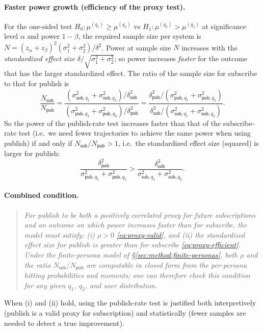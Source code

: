 \paragraph{Faster power growth (efficiency of the proxy test).}
For the one-sided test $H_0: \mu^{(q_1)} \geq \mu^{(q_2)}$ vs $H_1: \mu^{(q_2)} > \mu^{(q_1)}$ at significance level $\alpha$ and power $1-\beta$, the required sample size per system is $N = (z_\alpha + z_\beta)^2 (\sigma_1^2 + \sigma_2^2) / \delta^2$. Power at sample size $N$ increases with the \emph{standardized effect size} $\delta / \sqrt{\sigma_1^2 + \sigma_2^2}$; so power increases \emph{faster} for the outcome that has the larger standardized effect. The ratio of the sample size for subscribe to that for publish is
\begin{equation}
  \frac{N_{\mathsf{sub}}}{N_{\mathsf{pub}}} = \frac{(\sigma_{\mathsf{sub},q_1}^2 + \sigma_{\mathsf{sub},q_2}^2) / \delta_{\mathsf{sub}}^2}{(\sigma_{\mathsf{pub},q_1}^2 + \sigma_{\mathsf{pub},q_2}^2) / \delta_{\mathsf{pub}}^2} = \frac{\delta_{\mathsf{pub}}^2 / (\sigma_{\mathsf{pub},q_1}^2 + \sigma_{\mathsf{pub},q_2}^2)}{\delta_{\mathsf{sub}}^2 / (\sigma_{\mathsf{sub},q_1}^2 + \sigma_{\mathsf{sub},q_2}^2)}.
\end{equation}
So the power of the publish-rate test increases faster than that of the subscribe-rate test (i.e.\ we need fewer trajectories to achieve the same power when using publish) if and only if $N_{\mathsf{sub}} / N_{\mathsf{pub}} > 1$, i.e.\ the standardized effect size (squared) is larger for publish:
\begin{equation}
  \frac{\delta_{\mathsf{pub}}^2}{\sigma_{\mathsf{pub},q_1}^2 + \sigma_{\mathsf{pub},q_2}^2} > \frac{\delta_{\mathsf{sub}}^2}{\sigma_{\mathsf{sub},q_1}^2 + \sigma_{\mathsf{sub},q_2}^2}. \label{eq:proxy-efficient}
\end{equation}

\paragraph{Combined condition.}
\begin{quote}
\emph{For publish to be both a positively correlated proxy for future subscriptions and an outcome on which power increases faster than for subscribe, the model must satisfy: (i) $\rho > 0$ \eqref{eq:proxy-valid}, and (ii) the standardized effect size for publish is greater than for subscribe \eqref{eq:proxy-efficient}. Under the finite-persona model of \S\ref{sec:method:finite-personas}, both $\rho$ and the ratio $N_{\mathsf{sub}}/N_{\mathsf{pub}}$ are computable in closed form from the per-persona hitting probabilities and moments; one can therefore check this condition for any given $q_1$, $q_2$, and user distribution.}
\end{quote}
When (i) and (ii) hold, using the publish-rate test is justified both interpretively (publish is a valid proxy for subscription) and statistically (fewer samples are needed to detect a true improvement).

